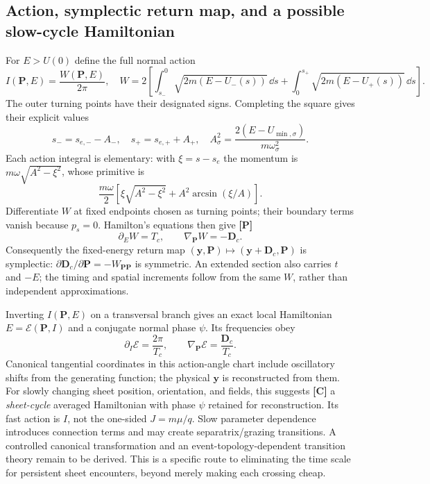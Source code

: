 \documentclass[10pt,a4paper]{article}
\newcommand{\y}{\mathbf y}\newcommand{\x}{\mathbf x}\renewcommand{\v}{\mathbf v}\newcommand{\p}{\mathbf p}
\newcommand{\proved}{\textbf{[P]}}
\newcommand{\conj}{\textbf{[C]}}
\begin{document}
\subsection{Action, symplectic return map, and a possible slow-cycle Hamiltonian}
For $E>U(0)$ define the full normal action
\begin{equation}\label{eq:action}
 I(\mathbf P,E)=\frac{W(\mathbf P,E)}{2\pi},\quad
 W=2\left[\int_{s_-}^{0}\sqrt{2m(E-U_-(s))}\,\dd s
              +\int_{0}^{s_+}\sqrt{2m(E-U_+(s))}\,\dd s\right].
\end{equation}
The outer turning points have their designated signs. Completing the square gives their explicit values
\begin{equation}
 s_-=s_{e,-}-A_-,\quad s_+=s_{e,+}+A_+,\quad
 A_\sigma^2=\frac{2(E-U_{\min,\sigma})}{m\omega_\sigma^2}.
\end{equation}
Each action integral is elementary: with $\xi=s-s_e$ the momentum is $m\omega\sqrt{A^2-\xi^2}$, whose primitive is
\begin{equation}
 \frac{m\omega}{2}\left[\xi\sqrt{A^2-\xi^2}
                   +A^2\arcsin(\xi/A)\right].
\end{equation}
Differentiate $W$ at fixed endpoints chosen as turning points; their boundary terms vanish because $p_s=0$. Hamilton's equations then give \proved{}
\begin{equation}\label{eq:actionderivatives}
 \partial_E W=T_c,\qquad
 \nabla_{\mathbf P}W=-\mathbf D_c.
\end{equation}
Consequently the fixed-energy return map $(\y,\mathbf P)\mapsto(\y+\mathbf D_c,\mathbf P)$ is symplectic: $\partial\mathbf D_c/\partial\mathbf P=-W_{\mathbf P\mathbf P}$ is symmetric. An extended section also carries $t$ and $-E$; the timing and spatial increments follow from the same $W$, rather than independent approximations.

Inverting $I(\mathbf P,E)$ on a transversal branch gives an exact local Hamiltonian $E=\mathcal E(\mathbf P,I)$ and a conjugate normal phase $\psi$. Its frequencies obey
\begin{equation}\label{eq:normalfreq}
 \partial_I\mathcal E=\frac{2\pi}{T_c},\qquad
 \nabla_{\mathbf P}\mathcal E=\frac{\mathbf D_c}{T_c}.
\end{equation}
Canonical tangential coordinates in this action-angle chart include oscillatory shifts from the generating function; the physical $\y$ is reconstructed from them. For slowly changing sheet position, orientation, and fields, this suggests \conj{} a \emph{sheet-cycle} averaged Hamiltonian with phase $\psi$ retained for reconstruction. Its fast action is $I$, not the one-sided $J=m\mu/q$. Slow parameter dependence introduces connection terms and may create separatrix/grazing transitions. A controlled canonical transformation and an event-topology-dependent transition theory remain to be derived. This is a specific route to eliminating the time scale for persistent sheet encounters, beyond merely making each crossing cheap.
\end{document}
